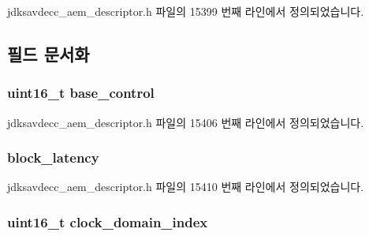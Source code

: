 jdksavdecc\+\_\+aem\+\_\+descriptor.\+h 파일의 15399 번째 라인에서 정의되었습니다.



\subsection{필드 문서화}
\subsubsection[{\texorpdfstring{base\+\_\+control}{base_control}}]{\setlength{\rightskip}{0pt plus 5cm}uint16\+\_\+t base\+\_\+control}\hypertarget{structjdksavdecc__descriptor__internal__port_af06eac7dd98377a85258308e8a25e7f2}{}\label{structjdksavdecc__descriptor__internal__port_af06eac7dd98377a85258308e8a25e7f2}


jdksavdecc\+\_\+aem\+\_\+descriptor.\+h 파일의 15406 번째 라인에서 정의되었습니다.

\subsubsection[{\texorpdfstring{block\+\_\+latency}{block_latency}}]{ block\+\_\+latency}\hypertarget{structjdksavdecc__descriptor__internal__port_ae2e9f0088d5e900b610d1b2818dfc559}{}\label{structjdksavdecc__descriptor__internal__port_ae2e9f0088d5e900b610d1b2818dfc559}


jdksavdecc\+\_\+aem\+\_\+descriptor.\+h 파일의 15410 번째 라인에서 정의되었습니다.

\subsubsection[{\texorpdfstring{clock\+\_\+domain\+\_\+index}{clock_domain_index}}]{\setlength{\rightskip}{0pt plus 5cm}uint16\+\_\+t clock\+\_\+domain\+\_\+index}\hypertarget{structjdksavdecc__descriptor__internal__port_a6608f023d147b556a49527d568abed8e}{}\label{structjdksavdecc__descriptor__internal__port_a6608f023d147b556a49527d568abed8e}


